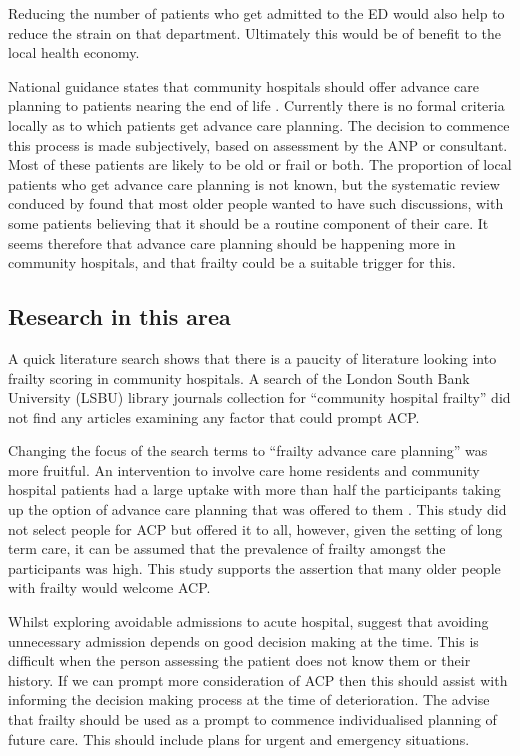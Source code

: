 \documentclass
[
	12pt,
	a4paper,
	oneside,
]{report}
\begin{document}
Reducing the number of patients who get admitted to the ED would
also help to reduce the strain on that department. Ultimately this would be of
benefit to the local health economy.

National guidance states that community hospitals should offer advance care
planning to patients nearing the end of life \parencite{dh:09}.
Currently there is no formal criteria locally as to which patients get advance 
care planning.
The decision to commence this process is made subjectively, based on assessment 
by the ANP or consultant. Most of these patients are likely to be old or frail
or both. The proportion of local patients who get advance care planning is not known,
but the systematic review conduced by \textcite{sharp:13} found that most older
people wanted to have such discussions, with some patients believing that it 
should be a routine component of their care.  
It seems therefore that advance care planning should be happening more in community
hospitals, and that frailty could be a suitable trigger for this.

\subsection{Research in this area}

A quick literature search shows that there is a paucity of literature looking 
into frailty scoring in community hospitals.
A search of the London South Bank University (LSBU) library journals 
collection for ``community hospital frailty''
did not find any articles examining any factor that could prompt ACP.

Changing the focus of the search terms to ``frailty advance care planning''
was more fruitful.
An intervention to involve care home residents and community hospital patients
had a large uptake with more than half the participants taking up the option of
advance care planning that was offered to them \parencite{mcglade:17}. This 
study did not select people for ACP but offered it to all, however, given the 
setting of long term care, it can be assumed that the prevalence of frailty
amongst the participants was high. This study supports the assertion that many
older people with frailty would welcome ACP.

Whilst exploring avoidable admissions to acute hospital, \textcite{mytton:12} 
suggest that avoiding unnecessary admission depends on good decision making at 
the time. This is difficult when the person assessing the patient does not know
them or their history. If we can prompt more consideration of ACP then this 
should assist with informing the decision making process at the time of 
deterioration.  
The \textcite{bgs:14} advise that frailty should be used as a prompt to
commence individualised planning of future care. This should include plans
for urgent and emergency situations.
\end{document}
